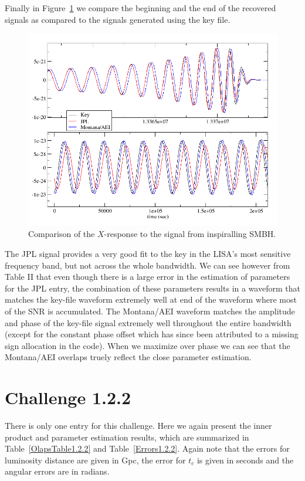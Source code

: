 \documentclass[prd,aps,amsfonts,amsmath, nofootinbib]{revtex4}
\begin{document}
Finally in Figure~\ref{fig1.2.1} we compare the beginning and the end of the recovered signals as compared to the signals generated using the key file. 
\begin{figure}[ht]
\includegraphics[height=0.6\textheight,
keepaspectratio=true,angle=0]{1_2_1X}
\caption{Comparison of the $X$-response to the signal from inspiralling SMBH. }
\label{fig1.2.1}
\end{figure}

The JPL signal provides a very good fit to the key in the LISA's most sensitive frequency band, but not across the whole bandwidth.  We can see however from Table II that even though there is a large error in the estimation of parameters for the JPL entry, the combination of these parameters results in a waveform that matches  the key-file waveform extremely well at end of the waveform where most of the SNR is accumulated.  The Montana/AEI waveform matches the amplitude and phase of the key-file signal extremely well throughout the entire bandwidth (except for the constant phase offset which has since been attributed to a missing sign allocation in the code).  When we maximize over phase we can see that the Montana/AEI overlaps truely reflect the close parameter estimation. 

 
\section{Challenge 1.2.2}

There is only one entry for this challenge. Here we again present the inner product and parameter estimation results, which are summarized in Table~\ref{OlapsTable1.2.2} and Table~\ref{Errors1.2.2}.  Again note that the errors for luminosity distance are given in Gpc, the error for $t_{c}$ is given in seconds and the angular errors are in radians.
\end{document}
